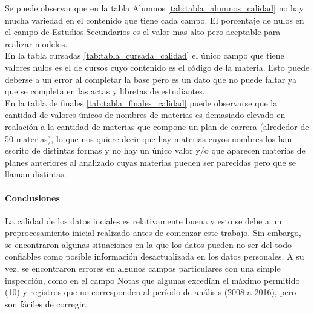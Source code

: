 




Se puede observar que en la tabla Alumnos \ref{tab:tabla_alumnos_calidad} no hay mucha variedad en el contenido que tiene cada campo. El porcentaje de nulos en el campo de Estudios.Secundarios es el valor mas alto pero aceptable para realizar modelos.\\

En la tabla cursadas \ref{tab:tabla_cursada_calidad} el único campo que tiene valores nulos es el de cursos cuyo contenido es el código de la materia. Esto puede deberse a un error al completar la base pero es un dato que no puede faltar ya que se completa en las actas y libretas de estudiantes.\\

En la tabla de finales \ref{tab:tabla_finales_calidad} puede observarse que la cantidad de valores únicos de nombres de materias es demasiado elevado en realación a la cantidad de materias que compone un plan de carrera (alrededor de 50 materias), lo que nos quiere decir que hay materias cuyos nombres los han escrito de distintas formas y no hay un único valor y/o que aparecen materias de planes anteriores al analizado cuyas materias pueden ser parecidas pero que se llaman distintas.


\paragraph{\textbf{Conclusiones}}
La calidad de los datos inciales es relativamente buena y esto se debe a un preprocesamiento inicial realizado antes de comenzar este trabajo. Sin embargo, se encontraron algunas situaciones en la que los datos pueden no ser del todo confiables como posible información desactualizada en los datos personales. A su vez, se encontraron errores en algunos campos particulares con una simple inspección, como en el campo Notas que algunas excedían el máximo permitido (10) y registros que no corresponden al período de análisis (2008 a 2016), pero son fáciles de corregir.

